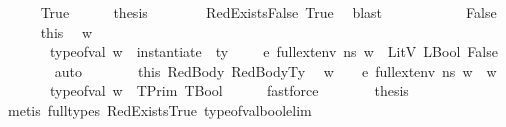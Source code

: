 \begin{isabellebody}
\ \ \ \ \isamarkupfalse%
\ True\isanewline
\ \ \ \ \isamarkupfalse%
\ {\isacharquery}{\kern0pt}thesis\isanewline
\ \ \ \ \ \ \isamarkupfalse%
\ RedExistsFalse\ True\ \isamarkupfalse%
\ blast\ \ \ \isanewline
\ \ \isamarkupfalse%
\isanewline
\ \ \ \ \isamarkupfalse%
\ False\isanewline
\ \ \ \ \isamarkupfalse%
\ this\ \isamarkupfalse%
\ w\ \isanewline
\ \ \ \ \ \ \ {\isachardoublequoteopen}type{\isacharunderscore}{\kern0pt}of{\isacharunderscore}{\kern0pt}val\ w\ {\isacharequal}{\kern0pt}\ instantiate\ {\isasymOmega}\ ty{\isachardoublequoteclose}\ \ {\isachardoublequoteopen}{\isasymnot}\ {\isacharparenleft}{\kern0pt}{\isasymLambda}{\isacharcomma}{\kern0pt}{\isasymGamma}{\isacharcomma}{\kern0pt}{\isasymOmega}\ {\isasymturnstile}\ {\isasymlangle}e{\isacharcomma}{\kern0pt}\ full{\isacharunderscore}{\kern0pt}ext{\isacharunderscore}{\kern0pt}env\ n{\isacharunderscore}{\kern0pt}s\ w{\isasymrangle}\ {\isasymDown}\ LitV\ {\isacharparenleft}{\kern0pt}LBool\ False{\isacharparenright}{\kern0pt}{\isacharparenright}{\kern0pt}{\isachardoublequoteclose}\isanewline
\ \ \ \ \ \ \isamarkupfalse%
\ auto\isanewline
\ \ \ \ \isamarkupfalse%
\ \isamarkupfalse%
\ this\ RedBody\ RedBodyTy\ \isamarkupfalse%
\ w{\isacharprime}{\kern0pt}\ \ {\isachardoublequoteopen}{\isasymLambda}{\isacharcomma}{\kern0pt}{\isasymGamma}{\isacharcomma}{\kern0pt}{\isasymOmega}\ {\isasymturnstile}\ {\isasymlangle}e{\isacharcomma}{\kern0pt}\ full{\isacharunderscore}{\kern0pt}ext{\isacharunderscore}{\kern0pt}env\ n{\isacharunderscore}{\kern0pt}s\ w{\isasymrangle}\ {\isasymDown}\ w{\isacharprime}{\kern0pt}{\isachardoublequoteclose}\isanewline
\ \ \ \ \ \ \ {\isachardoublequoteopen}type{\isacharunderscore}{\kern0pt}of{\isacharunderscore}{\kern0pt}val\ w{\isacharprime}{\kern0pt}\ {\isacharequal}{\kern0pt}\ TPrim\ {\isacharparenleft}{\kern0pt}TBool{\isacharparenright}{\kern0pt}{\isachardoublequoteclose}\isanewline
\ \ \ \ \isamarkupfalse%
\ fastforce\isanewline
\ \ \ \ \isamarkupfalse%
\ \isamarkupfalse%
\ {\isacharquery}{\kern0pt}thesis\isanewline
\ \ \ \ \ \ \isamarkupfalse%
\ {\isacharparenleft}{\kern0pt}metis\ {\isacharparenleft}{\kern0pt}full{\isacharunderscore}{\kern0pt}types{\isacharparenright}{\kern0pt}\ RedExistsTrue\ type{\isacharunderscore}{\kern0pt}of{\isacharunderscore}{\kern0pt}val{\isacharunderscore}{\kern0pt}bool{\isacharunderscore}{\kern0pt}elim{\isacharparenright}{\kern0pt}\ \isanewline

\end{isabellebody}
